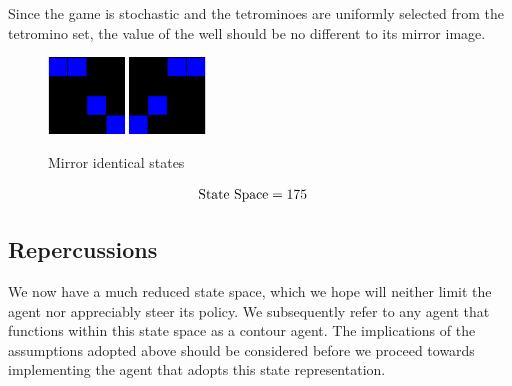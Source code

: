 \documentclass{rucsthesis}
\begin{document}
Since the game is stochastic and the tetrominoes are uniformly selected from the tetromino set, the value of the well should be no different to its mirror image.

\begin{figure}[h]
\centering
\includegraphics[width=0.8in]{reducedwell.png}
\includegraphics[width=0.8in]{mirrorwell.png}
\caption{Mirror identical states}
\label{fig:mirrorwell}
\end{figure}

\begin{eqnarray*}
\centering
\textrm{State Space} & = 175
\end{eqnarray*}

\subsection*{Repercussions}

We now have a much reduced state space, which we hope will neither limit the agent nor appreciably steer its policy. We subsequently refer to any agent that functions within this state space as a contour agent. The implications of the assumptions adopted above should be considered before we proceed towards implementing the agent that adopts this state representation.
\end{document}
